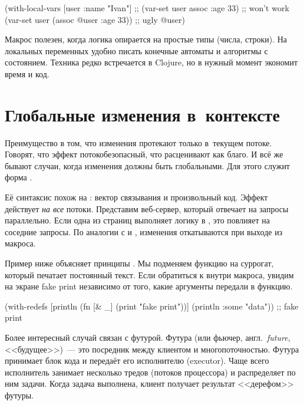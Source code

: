 \else

\begin{clojure}
(with-local-vars [user {:name "Ivan"}]
  ;; (var-set user assoc :age 33) ;; won't work
  (var-set user (assoc @user :age 33)) ;; ugly
  @user)
\end{clojure}

\fi

Макрос  полезен, когда логика опирается на простые типы
(числа, строки). На локальных переменных удобно писать конечные автоматы и
алгоритмы с состоянием. Техника редко встречается в Clojure, но в нужный момент
экономит время и код.

\section{Глобальные изменения в~контексте}


\label{with-redefs}

Преимущество  в том, что изменения протекают только в~текущем
потоке. Говорят, что эффект  потокобезопасный, что расценивают
как благо. И всё же бывают случаи, когда изменения должны быть глобальными. Для
этого служит форма .

Её синтаксис похож на : вектор связывания и произвольный
код. Эффект  действует \emph{на все} потоки. Представим
веб-сервер, который отвечает на запросы параллельно. Если одна из страниц
выполняет логику в , это повлияет на соседние
запросы. По аналогии с  и , изменения откатываются при
выходе из макроса.

Пример ниже объясняет принципы . Мы подменяем функцию
 на суррогат, который печатает постоянный текст. Если обратиться к
 внутри макроса, увидим на экране fake print независимо от того,
какие аргументы передали в функцию.

\begin{clojure}
(with-redefs [println
              (fn [& _]
                (print "fake print\n"))]
  (println {:some "data"}))
;; fake print
\end{clojure}


Более интересный случай связан с футурой. Футура (или фьючер,
англ.~\emph{future}, <<будущее>>)~--- это посредник между клиентом и
многопоточностью. Футура принимает блок кода и передаёт его исполнителю
(executor). Чаще всего исполнитель занимает несколько тредов (потоков
процессора) и распределяет по ним задачи. Когда задача выполнена, клиент
получает результат <<дерефом>> футуры.


